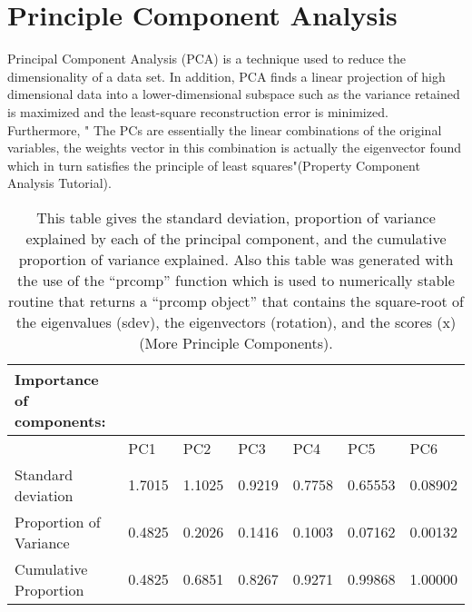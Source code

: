 \documentclass{article}\usepackage[]{graphicx}\usepackage[]{color}
\begin{document}
\section{Principle Component Analysis}
Principal Component Analysis (PCA) is a technique used to reduce the dimensionality of a data set. In addition, PCA finds a linear projection of high dimensional data into a lower-dimensional subspace such as the variance retained is maximized and the least-square reconstruction error is minimized. Furthermore, " The PCs are essentially the linear combinations of the original variables, the weights vector in this combination is actually the eigenvector found which in turn satisfies the principle of least squares"(Property Component Analysis Tutorial).



\begin{table}[h]
\centering %
\begin{tabular}{lllllll} 
\hline\hline %
Importance of components:                    &                             &                             &                             &                             &                              &                              \\ \hline
\multicolumn{1}{|l|}{}                       & \multicolumn{1}{l|}{PC1}    & \multicolumn{1}{l|}{PC2}    & \multicolumn{1}{l|}{PC3}    & \multicolumn{1}{l|}{PC4}    & \multicolumn{1}{l|}{PC5}     & \multicolumn{1}{l|}{PC6}     \\ \hline
\multicolumn{1}{|l|}{Standard deviation}     & \multicolumn{1}{l|}{1.7015} & \multicolumn{1}{l|}{1.1025} & \multicolumn{1}{l|}{0.9219} & \multicolumn{1}{l|}{0.7758} & \multicolumn{1}{l|}{0.65553} & \multicolumn{1}{l|}{0.08902} \\ \hline
\multicolumn{1}{|l|}{Proportion of Variance} & \multicolumn{1}{l|}{0.4825} & \multicolumn{1}{l|}{0.2026} & \multicolumn{1}{l|}{0.1416} & \multicolumn{1}{l|}{0.1003} & \multicolumn{1}{l|}{0.07162} & \multicolumn{1}{l|}{0.00132} \\ \hline
\multicolumn{1}{|l|}{Cumulative Proportion}  & \multicolumn{1}{l|}{0.4825} & \multicolumn{1}{l|}{0.6851} & \multicolumn{1}{l|}{0.8267} & \multicolumn{1}{l|}{0.9271} & \multicolumn{1}{l|}{0.99868} & \multicolumn{1}{l|}{1.00000} \\ \hline
\end{tabular}
\caption{This table gives the standard deviation, proportion of variance explained by each of the principal component, and the cumulative proportion of variance explained. Also this table was generated with the use of  the “prcomp” function which is used to numerically stable routine that returns a “prcomp object” that contains the square-root of the eigenvalues (sdev), the eigenvectors (rotation), and the scores (x) (More Principle Components).}
\end{table}
\end{document}

